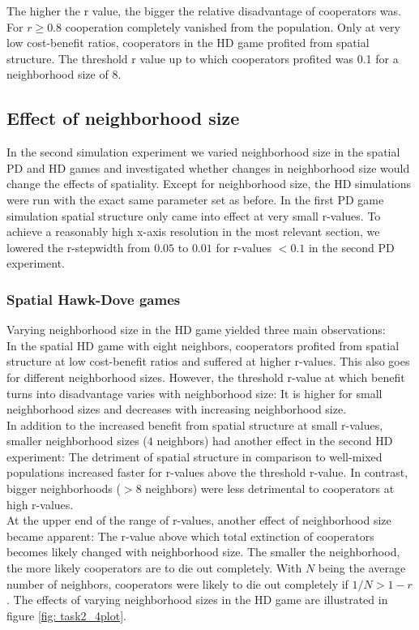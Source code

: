 The higher the r value, the bigger the relative disadvantage of cooperators was. For $r \geq 0.8$ cooperation completely vanished from the population. Only at very low cost-benefit ratios, cooperators in the HD game profited from spatial structure. The threshold r value up to which cooperators profited was 0.1 for a neighborhood size of 8.



\subsection{Effect of neighborhood size}

In the second simulation experiment we varied neighborhood size in the spatial PD and HD games and investigated whether changes in neighborhood size would change the effects of spatiality. Except for neighborhood size, the HD simulations were run with the exact same parameter set as before. In the first PD game simulation spatial structure only came into effect at very small r-values. To achieve a reasonably high x-axis resolution in the most relevant section, we lowered the r-stepwidth from $0.05$ to $0.01$ for r-values $< 0.1$ in the second PD experiment.

\subsubsection*{Spatial Hawk-Dove games}
Varying neighborhood size in the HD game yielded three main observations:\\ 
In the spatial HD game with eight neighbors, cooperators profited from spatial structure at low cost-benefit ratios and suffered at higher r-values. This also goes for different neighborhood sizes. However, the threshold r-value at which benefit turns into disadvantage varies with neighborhood size: It is higher for small neighborhood sizes and decreases with increasing neighborhood size.\\
In addition to the increased benefit from spatial structure at small r-values, smaller neighborhood sizes ($4$ neighbors) had another effect in the second HD experiment: The detriment of spatial structure in comparison to well-mixed populations increased faster for r-values above the threshold r-value. In contrast, bigger neighborhoods ($>8$ neighbors) were less detrimental to cooperators at high r-values.\\
At the upper end of the range of r-values, another effect of neighborhood size became apparent: The r-value above which total extinction of cooperators becomes likely changed with neighborhood size. The smaller the neighborhood, the more likely cooperators are to die out completely. With $N$ being the average number of neighbors, cooperators were likely to die out completely if $1 / N > 1 - r$. The effects of varying neighborhood sizes in the HD game are illustrated in figure \ref{fig: task2_4plot}.\\


